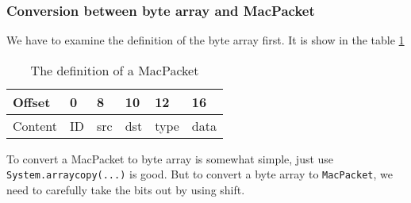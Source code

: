 \documentclass[conference,compsoc]{IEEEtran}
\begin{document}
		\subsubsection{Conversion between byte array and MacPacket}
			We have to examine the definition of the byte array first. It is show in the table \ref{MacPacket_dataDef}
			\begin{table}[ht]
			\begin{center}\begin{tabular}{m{0.5cm}m{2cm}m{0.5cm}m{0.5cm}m{1cm}m{1cm}}\label{MacPacket_dataDef}
				Offset                        & 0                       & 8                        & 10                       & 12                        & 16                        \\ \hline
				\multicolumn{1}{|l|}{Content} & \multicolumn{1}{l|}{ID} & \multicolumn{1}{l|}{src} & \multicolumn{1}{l|}{dst} & \multicolumn{1}{l|}{type} & \multicolumn{1}{l|}{data} \\ \hline
			\end{tabular}\end{center}
			\caption{The definition of a MacPacket}
			\end{table}
			\par
			To convert a MacPacket to byte array is somewhat simple, just use \lstinline{System.arraycopy(...)} is good. But to convert a byte array to \lstinline{MacPacket}, we need to carefully take the bits out by using shift.
\end{document}
